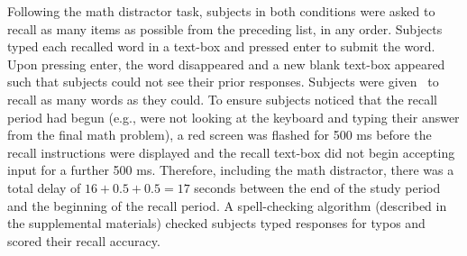 \documentclass[man,natbib,floatsintext]{apa6} %
\begin{document}
Following the math distractor task, subjects in both conditions were asked to recall as many items as possible from the preceding list, in any order. Subjects typed each recalled word in a text-box and pressed enter to submit the word. Upon pressing enter, the word disappeared and a new blank text-box appeared such that subjects could not see their prior responses. Subjects were given \recalltime~to recall as many words as they could. To ensure subjects noticed that the recall period had begun (e.g., were not looking at the keyboard and typing their answer from the final math problem), a red screen was flashed for 500 ms before the recall instructions were displayed and the recall text-box did not begin accepting input for a further 500 ms. Therefore, including the math distractor, there was a total delay of $16+0.5+0.5=17$ seconds between the end of the study period and the beginning of the recall period. A spell-checking algorithm (described in the supplemental materials) checked subjects typed responses for typos and scored their recall accuracy.
\end{document}
